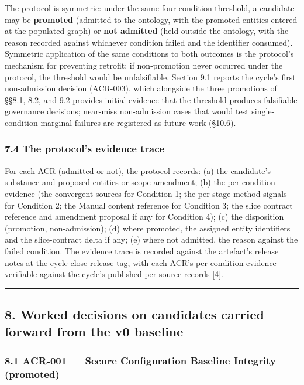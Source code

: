 \documentclass[
]{article}
\begin{document}
The protocol is symmetric: under the same four-condition threshold, a
candidate may be \textbf{promoted} (admitted to the ontology, with the
promoted entities entered at the populated graph) or \textbf{not
admitted} (held outside the ontology, with the reason recorded against
whichever condition failed and the identifier consumed). Symmetric
application of the same conditions to both outcomes is the protocol's
mechanism for preventing retrofit: if non-promotion never occurred under
the protocol, the threshold would be unfalsifiable. Section 9.1 reports
the cycle's first non-admission decision (ACR-003), which alongside the
three promotions of §§8.1, 8.2, and 9.2 provides initial evidence that
the threshold produces falsifiable governance decisions; near-miss
non-admission cases that would test single-condition marginal failures
are registered as future work (§10.6).

\subsubsection{7.4 The protocol's evidence
trace}\label{the-protocols-evidence-trace}

For each ACR (admitted or not), the protocol records: (a) the
candidate's substance and proposed entities or scope amendment; (b) the
per-condition evidence (the convergent sources for Condition 1; the
per-stage method signals for Condition 2; the Manual content reference
for Condition 3; the slice contract reference and amendment proposal if
any for Condition 4); (c) the disposition (promotion, non-admission);
(d) where promoted, the assigned entity identifiers and the
slice-contract delta if any; (e) where not admitted, the reason against
the failed condition. The evidence trace is recorded against the
artefact's release notes at the cycle-close release tag, with each ACR's
per-condition evidence verifiable against the cycle's published
per-source records {[}4{]}.

\begin{center}\rule{0.5\linewidth}{0.5pt}\end{center}

\subsection{8. Worked decisions on candidates carried forward from the
v0
baseline}\label{worked-decisions-on-candidates-carried-forward-from-the-v0-baseline}

\subsubsection{8.1 ACR-001 --- Secure Configuration Baseline Integrity
(promoted)}\label{acr-001-secure-configuration-baseline-integrity-promoted}
\end{document}

